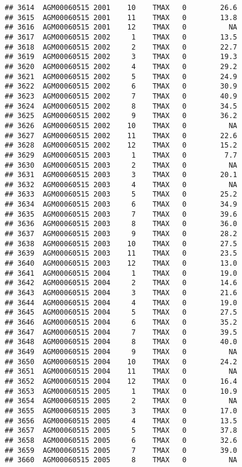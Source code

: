 \documentclass{article}\usepackage[]{graphicx}\usepackage[]{color}
\makeatletter
\newenvironment{kframe}{%
 \def\at@end@of@kframe{}%
 \ifinner\ifhmode%
  \def\at@end@of@kframe{\end{minipage}}%
  \begin{minipage}{\columnwidth}%
 \fi\fi%
 \def\FrameCommand##1{\hskip\@totalleftmargin \hskip-\fboxsep
 \colorbox{shadecolor}{##1}\hskip-\fboxsep
     \hskip-\linewidth \hskip-\@totalleftmargin \hskip\columnwidth}%
 \MakeFramed {\advance\hsize-\width
   \@totalleftmargin\z@ \linewidth\hsize
   \@setminipage}}%
 {\par\unskip\endMakeFramed%
 \at@end@of@kframe}
\newenvironment{knitrout}{}{} %
\makeatother
\begin{document}
\begin{knitrout}
\begin{kframe}
\begin{verbatim}
## 3614  AGM00060515 2001    10    TMAX   0        26.6
## 3615  AGM00060515 2001    11    TMAX   0        13.8
## 3616  AGM00060515 2001    12    TMAX   0          NA
## 3617  AGM00060515 2002     1    TMAX   0        13.5
## 3618  AGM00060515 2002     2    TMAX   0        22.7
## 3619  AGM00060515 2002     3    TMAX   0        19.3
## 3620  AGM00060515 2002     4    TMAX   0        29.2
## 3621  AGM00060515 2002     5    TMAX   0        24.9
## 3622  AGM00060515 2002     6    TMAX   0        30.9
## 3623  AGM00060515 2002     7    TMAX   0        40.9
## 3624  AGM00060515 2002     8    TMAX   0        34.5
## 3625  AGM00060515 2002     9    TMAX   0        36.2
## 3626  AGM00060515 2002    10    TMAX   0          NA
## 3627  AGM00060515 2002    11    TMAX   0        22.6
## 3628  AGM00060515 2002    12    TMAX   0        15.2
## 3629  AGM00060515 2003     1    TMAX   0         7.7
## 3630  AGM00060515 2003     2    TMAX   0          NA
## 3631  AGM00060515 2003     3    TMAX   0        20.1
## 3632  AGM00060515 2003     4    TMAX   0          NA
## 3633  AGM00060515 2003     5    TMAX   0        25.2
## 3634  AGM00060515 2003     6    TMAX   0        34.9
## 3635  AGM00060515 2003     7    TMAX   0        39.6
## 3636  AGM00060515 2003     8    TMAX   0        36.0
## 3637  AGM00060515 2003     9    TMAX   0        28.2
## 3638  AGM00060515 2003    10    TMAX   0        27.5
## 3639  AGM00060515 2003    11    TMAX   0        23.5
## 3640  AGM00060515 2003    12    TMAX   0        13.0
## 3641  AGM00060515 2004     1    TMAX   0        19.0
## 3642  AGM00060515 2004     2    TMAX   0        14.6
## 3643  AGM00060515 2004     3    TMAX   0        21.6
## 3644  AGM00060515 2004     4    TMAX   0        19.0
## 3645  AGM00060515 2004     5    TMAX   0        27.5
## 3646  AGM00060515 2004     6    TMAX   0        35.2
## 3647  AGM00060515 2004     7    TMAX   0        39.5
## 3648  AGM00060515 2004     8    TMAX   0        40.0
## 3649  AGM00060515 2004     9    TMAX   0          NA
## 3650  AGM00060515 2004    10    TMAX   0        24.2
## 3651  AGM00060515 2004    11    TMAX   0          NA
## 3652  AGM00060515 2004    12    TMAX   0        16.4
## 3653  AGM00060515 2005     1    TMAX   0        10.9
## 3654  AGM00060515 2005     2    TMAX   0          NA
## 3655  AGM00060515 2005     3    TMAX   0        17.0
## 3656  AGM00060515 2005     4    TMAX   0        13.5
## 3657  AGM00060515 2005     5    TMAX   0        37.8
## 3658  AGM00060515 2005     6    TMAX   0        32.6
## 3659  AGM00060515 2005     7    TMAX   0        39.0
## 3660  AGM00060515 2005     8    TMAX   0          NA

\end{verbatim}
\end{kframe}
\end{knitrout}
\end{document}
